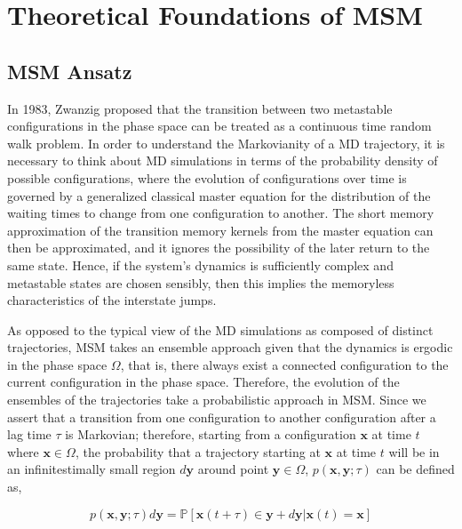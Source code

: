 \section{Theoretical Foundations of MSM}

\subsection{MSM Ansatz}

\begin{spacing}{2.0}
    In 1983, Zwanzig proposed that the transition between two metastable configurations in the phase space can be treated as a continuous time 
    random walk problem. \cite{P-JStatPhys-1983-v30-Zwanzig} In order to understand the Markovianity of a MD trajectory, it is necessary to think 
    about MD simulations in terms of the probability density of possible configurations, where the evolution of configurations over time is governed 
    by a generalized classical master equation for the distribution of the waiting times to change from one configuration to another. The short memory 
    approximation of the transition memory kernels from the master equation can then be approximated, and it ignores the possibility of the later 
    return to the same state. Hence, if the system's dynamics is sufficiently complex and metastable states are chosen sensibly, then this implies 
    the memoryless characteristics of the interstate jumps. \cite{P-JStatPhys-1983-v30-Zwanzig}

    As opposed to the typical view of the MD simulations as composed of distinct trajectories, MSM takes an ensemble approach given that the dynamics 
    is ergodic in the phase space $\Omega$, that is, there always exist a connected configuration to the current configuration in the phase space. 
    Therefore, the evolution of the ensembles of the trajectories take a probabilistic approach in MSM. Since we assert that a transition from one 
    configuration to another configuration after a lag time $\tau$ is Markovian; therefore, starting from a configuration $\mathbf{x}$ at time $t$
    where $\mathbf{x} \in \Omega$, the probability that a trajectory starting at $\mathbf{x}$ at time $t$ will be in an infinitestimally small
    region $d\mathbf{y}$ around point $\mathbf{y} \in \Omega$, $p(\mathbf{x}, \mathbf{y}; \tau)$ can be defined as, 
    \cite{P-JChemPhys-2011-v134-Prinz, P-PhysChemChemPhys-2011-v13-Prinz}

    \begin{equation}
        p(\mathbf{x}, \mathbf{y}; \tau)d\mathbf{y} = \mathbb{P}[\mathbf{x}(t+\tau)\in\mathbf{y}+d\mathbf{y}|\mathbf{x}(t)=\mathbf{x}]
        \label{eq:msm-prob-def}
    \end{equation}


\end{spacing}
